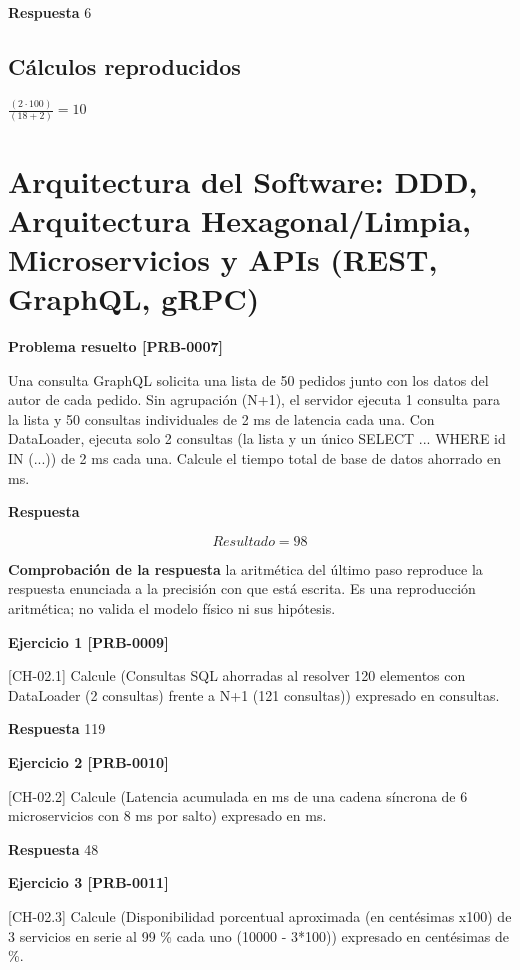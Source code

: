 \documentclass{book}
\begin{document}
\noindent\textbf{Respuesta} 6

\subsection*{Cálculos reproducidos}

\(\frac{\left(2\cdot 100\right)}{\left(18+2\right)} = 10\)

\section{Arquitectura del Software: DDD, Arquitectura Hexagonal/Limpia, Microservicios y APIs (REST, GraphQL, gRPC)}

\noindent\textbf{Problema resuelto [PRB-0007]}

Una consulta GraphQL solicita una lista de 50 pedidos junto con los datos del autor de cada pedido. Sin agrupación (N+1), el servidor ejecuta 1 consulta para la lista y 50 consultas individuales de 2 ms de latencia cada una. Con DataLoader, ejecuta solo 2 consultas (la lista y un único SELECT ... WHERE id IN (...)) de 2 ms cada una. Calcule el tiempo total de base de datos ahorrado en ms.

\noindent\textbf{Respuesta}

\[
Resultado = 98
\]

\noindent\textbf{Comprobación de la respuesta} la aritmética del último paso reproduce la respuesta enunciada a la precisión con que está escrita. Es una reproducción aritmética; no valida el modelo físico ni sus hipótesis.

\noindent\textbf{Ejercicio 1 [PRB-0009]}

[CH-02.1] Calcule (Consultas SQL ahorradas al resolver 120 elementos con DataLoader (2 consultas) frente a N+1 (121 consultas)) expresado en consultas.

\noindent\textbf{Respuesta} 119

\noindent\textbf{Ejercicio 2 [PRB-0010]}

[CH-02.2] Calcule (Latencia acumulada en ms de una cadena síncrona de 6 microservicios con 8 ms por salto) expresado en ms.

\noindent\textbf{Respuesta} 48

\noindent\textbf{Ejercicio 3 [PRB-0011]}

[CH-02.3] Calcule (Disponibilidad porcentual aproximada (en centésimas x100) de 3 servicios en serie al 99 \% cada uno (10000 - 3*100)) expresado en centésimas de \%.
\end{document}
